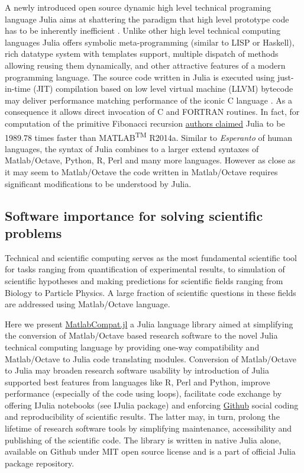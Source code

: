A newly introduced open source dynamic high level technical programing language Julia aims at shattering the paradigm that high level prototype code has to be inherently inefficient \cite{bezanson2012julia, bezanson2014julia}.  Unlike other high level technical computing languages Julia offers symbolic meta-programming (similar to LISP or Haskell), rich datatype system with templates support, multiple dispatch of methods allowing reusing them dynamically, and other attractive features of a modern programming language. The source code written in Julia is executed using just-in-time (JIT) compilation based on low level virtual machine (LLVM) \cite{Lattner_2004} bytecode may deliver performance matching performance of the iconic C language \cite{bezanson2012julia, bezanson2014julia}. As a consequence it allows direct invocation of C and FORTRAN routines. In fact, for computation of the primitive Fibonacci recursion \href{http://julialang.org/benchmarks/}{authors claimed} Julia to be 1989.78 times faster than MATLAB\textsuperscript{TM} R2014a. Similar to \textit{Esperanto} of human languages, the syntax of Julia combines to a larger extend syntaxes of Matlab/Octave, Python, R, Perl and many more languages. However as close as it may seem to Matlab/Octave the code written in Matlab/Octave requires significant modifications to be understood by Julia.

\subsection{Software importance for solving scientific problems}

Technical and scientific computing serves as the most fundamental scientific tool for tasks ranging from quantification of experimental results, to simulation of scientific hypotheses and making predictions for scientific fields ranging from Biology to Particle Physics. A large fraction of scientific questions in these fields are addressed using Matlab/Octave language.

Here we present \href{https://github.com/MatlabCompat/MatlabCompat.jl}{MatlabCompat.jl} a Julia language library aimed at simplifying the conversion of Matlab/Octave based research software to the novel Julia technical computing language by providing one-way compatibility and Matlab/Octave to Julia code translating modules. Conversion of Matlab/Octave to Julia may broaden research software usability by introduction of Julia supported best features from languages like R, Perl and Python, improve performance (especially of the code using loops), facilitate code exchange by offering IJulia notebooks (see IJulia package) and enforcing \href{http://github.com}{Github} social coding  and reproducibility of scientific results. The latter may, in turn, prolong the lifetime of research software tools by simplifying maintenance, accessibility and publishing of the scientific code. The library is written in native Julia alone, available on Github under MIT open source license and is a part of official Julia package repository.

